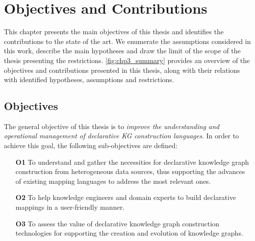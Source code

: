 \chapter{Objectives and Contributions}
\label{chapter:objectives}

This chapter presents the main objectives of this thesis and identifies the contributions to the state of the art. We enumerate the assumptions considered in this work, describe the main hypotheses and draw the limit of the scope of the thesis presenting the restrictions. \cref{fig:chp3_summary} provides an overview of the objectives and contributions presented in this thesis, along with their relations with identified hypotheses, assumptions and restrictions. 

\section{Objectives}
\label{sec:chp3-objectives}



The general objective of this thesis is to \textit{improve the understanding and operational management of declarative KG construction languages}. In order to achieve this goal, the following sub-objectives are defined:

\begin{enumerate}
    \item[\textbf{O1}] To understand and gather the necessities for declarative knowledge graph construction from heterogeneous data sources, thus supporting the advances of existing mapping languages to address the most relevant ones. 
    \item[\textbf{O2}] To help knowledge engineers and domain experts to build declarative mappings in a user-friendly manner.
    \item[\textbf{O3}] To assess the value of declarative knowledge graph construction technologies for supporting the creation and evolution of knowledge graphs. 
\end{enumerate}

